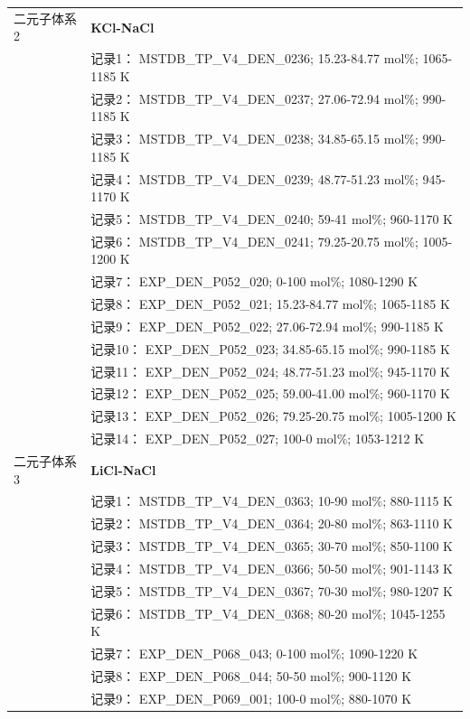 \documentclass[12pt]{article}
\begin{document}
{\begin{longtable}[]{@{}
  >{\raggedright\arraybackslash}p{}
  >{\raggedright\arraybackslash}p{}@{}}
二元子体系 2  & \textbf{KCl-NaCl} \\
 & 记录1： MSTDB\_TP\_V4\_DEN\_0236; 15.23-84.77 mol\%; 1065-1185 K \\
 & 记录2： MSTDB\_TP\_V4\_DEN\_0237; 27.06-72.94 mol\%; 990-1185 K \\
 & 记录3： MSTDB\_TP\_V4\_DEN\_0238; 34.85-65.15 mol\%; 990-1185 K \\
 & 记录4： MSTDB\_TP\_V4\_DEN\_0239; 48.77-51.23 mol\%; 945-1170 K \\
 & 记录5： MSTDB\_TP\_V4\_DEN\_0240; 59-41 mol\%; 960-1170 K \\
 & 记录6： MSTDB\_TP\_V4\_DEN\_0241; 79.25-20.75 mol\%; 1005-1200 K \\
 & 记录7： EXP\_DEN\_P052\_020; 0-100 mol\%; 1080-1290 K \\
 & 记录8： EXP\_DEN\_P052\_021; 15.23-84.77 mol\%; 1065-1185 K \\
 & 记录9： EXP\_DEN\_P052\_022; 27.06-72.94 mol\%; 990-1185 K \\
 & 记录10： EXP\_DEN\_P052\_023; 34.85-65.15 mol\%; 990-1185 K \\
 & 记录11： EXP\_DEN\_P052\_024; 48.77-51.23 mol\%; 945-1170 K \\
 & 记录12： EXP\_DEN\_P052\_025; 59.00-41.00 mol\%; 960-1170 K \\
 & 记录13： EXP\_DEN\_P052\_026; 79.25-20.75 mol\%; 1005-1200 K \\
 & 记录14： EXP\_DEN\_P052\_027; 100-0 mol\%; 1053-1212 K  \\

二元子体系 3  & \textbf{LiCl-NaCl} \\
 & 记录1： MSTDB\_TP\_V4\_DEN\_0363; 10-90 mol\%; 880-1115 K \\
 & 记录2： MSTDB\_TP\_V4\_DEN\_0364; 20-80 mol\%; 863-1110 K \\
 & 记录3： MSTDB\_TP\_V4\_DEN\_0365; 30-70 mol\%; 850-1100 K \\
 & 记录4： MSTDB\_TP\_V4\_DEN\_0366; 50-50 mol\%; 901-1143 K \\
 & 记录5： MSTDB\_TP\_V4\_DEN\_0367; 70-30 mol\%; 980-1207 K \\
 & 记录6： MSTDB\_TP\_V4\_DEN\_0368; 80-20 mol\%; 1045-1255 K \\
 & 记录7： EXP\_DEN\_P068\_043; 0-100 mol\%; 1090-1220 K \\
 & 记录8： EXP\_DEN\_P068\_044; 50-50 mol\%; 900-1120 K \\
 & 记录9： EXP\_DEN\_P069\_001; 100-0 mol\%; 880-1070 K  \\


\end{longtable}}
\end{document}

